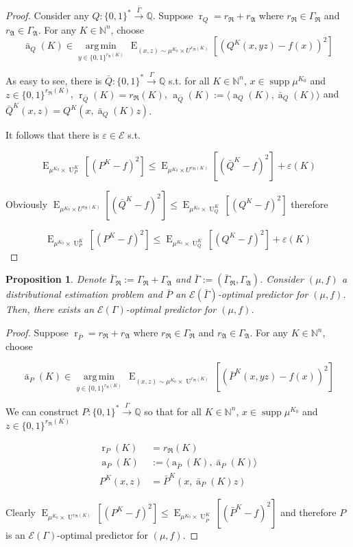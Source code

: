 \documentclass{article}
\numberwithin{equation}{section}
\theoremstyle{definition}
\theoremstyle{plain}
\newtheorem{proposition}{Proposition}[section]
\newcommand{\Bool}{\{0,1\}}
\newcommand{\Words}{{\Bool^*}}
\newcommand{\WordsLen}[1]{{\Bool^{#1}}}
\DeclareMathOperator{\Supp}{supp}
\DeclareMathOperator{\E}{E}
\DeclareMathOperator{\R}{r}
\DeclareMathOperator{\A}{a}
\DeclareMathOperator{\Un}{U}
\newcommand{\Argmin}[1]{\underset{#1}{\operatorname{arg\,min}}\,}
\newcommand{\Nats}{\mathbb{N}}
\newcommand{\Rats}{\mathbb{Q}}
\newcommand{\Chev}[1]{\langle #1 \rangle}
\newcommand{\GrowR}{\Gamma_{\mathfrak{R}}}
\newcommand{\GrowA}{\Gamma_{\mathfrak{A}}}
\newcommand{\Fall}{\mathcal{E}}
\newcommand{\EG}{\Fall(\Gamma)}
\newcommand{\Scheme}{\xrightarrow{\Gamma}}
\begin{document}
\begin{proof}

Consider any $Q: \Words \xrightarrow{\bar{\Gamma}} \Rats$. Suppose $\R_Q=r_{\mathfrak{R}}+r_{\mathfrak{A}}$ where $r_{\mathfrak{R}} \in \GrowR$ and $r_{\mathfrak{A}} \in \GrowA$. For any $K \in \Nats^n$, choose 
\[\bar{\A}_Q(K) \in \Argmin{y \in \WordsLen{r_{\mathfrak{A}}(K)}} \E_{(x,z) \sim \mu^{K_0} \times U^{r_{\mathfrak{R}}(K)}}[(Q^{K}(x,yz) - f(x))^2]\]

As easy to see, there is $\bar{Q}: \Words \Scheme \Rats$ s.t. for all $K \in \Nats^n$, $x \in \Supp \mu^{K_0}$ and $z \in \WordsLen{r_{\mathfrak{R}}(K)}$, $\R_{\bar{Q}}(K) = r_{\mathfrak{R}}(K)$, ${\A_{\bar{Q}}(K):=\Chev{\A_Q(K),\bar{\A}_Q(K)}}$ and ${\bar{Q}^{K}(x,z)=Q^{K}(x,\bar{\A}_Q(K)z)}$.

It follows that there is $\varepsilon \in \Fall$ s.t.

$$\E_{\mu^{K_0} \times \Un_P^{K}}[(P^{K} - f)^2] \leq \E_{\mu^{K_0} \times U^{r_{\mathfrak{R}}(K)}}[(\bar{Q}^{K} - f)^2] + \varepsilon(K)$$

Obviously $\E_{\mu^{K_0} \times U^{r_{\mathfrak{R}}(K)}}[(\bar{Q}^{K} - f)^2] \leq \E_{\mu^{K_0} \times \Un_Q^{K}}[(Q^{K} - f)^2]$ therefore

$$\E_{\mu^{K_0} \times \Un_P^{K}}[(P^{K} - f)^2] \leq \E_{\mu^{K_0} \times \Un_Q^{K}}[(Q^{K} - f)^2] + \varepsilon(K)$$
\end{proof}

\begin{proposition}

Denote $\bar{\Gamma}_{\mathfrak{R}}:=\GrowR+\GrowA$ and $\bar{\Gamma}:=(\bar{\Gamma}_{\mathfrak{R}},\GrowA)$. Consider $(\mu,f)$ a distributional estimation problem and $\bar{P}$ an $\Fall(\bar{\Gamma})$-optimal predictor for $(\mu,f)$. Then, there exists an $\EG$-optimal predictor for $(\mu,f)$.

\end{proposition}

\begin{proof}

Suppose $\R_{\bar{P}}=r_{\mathfrak{R}}+r_{\mathfrak{A}}$ where $r_{\mathfrak{R}} \in \GrowR$ and $r_{\mathfrak{A}} \in \GrowA$. For any ${K \in \Nats^n}$, choose 

\[\bar{\A}_P(K) \in \Argmin{y \in \WordsLen{r_{\mathfrak{A}}(K)}} \E_{(x,z) \sim \mu^{K_0} \times \Un^{r_{\mathfrak{R}}(K)}}[(\bar{P}^{K}(x,yz) - f(x))^2]\]

We can construct $P: \Words \Scheme \Rats$ so that for all $K \in \Nats^n$, $x \in \Supp \mu^{K_0}$ and ${z \in \WordsLen{r_{\mathfrak{R}}(K)}}$

\begin{align*}
\R_P(K) &= r_{\mathfrak{R}}(K) \\
\A_P(K) &:=\Chev{\A_{\bar{P}}(K),\bar{\A}_P(K)} \\
P^{K}(x,z) &=\bar{P}^{K}(x,\bar{\A}_P(K)z)
\end{align*}

Clearly ${\E_{\mu^{K_0} \times \Un^{r_{\mathfrak{R}}(K)}}[(P^{K} - f)^2] \leq \E_{\mu^{K_0} \times \Un_{\bar{P}}^{K}}[(\bar{P}^{K} - f)^2]}$ and therefore $P$ is an $\EG$-optimal predictor for $(\mu,f)$.
\end{proof}
\end{document}
